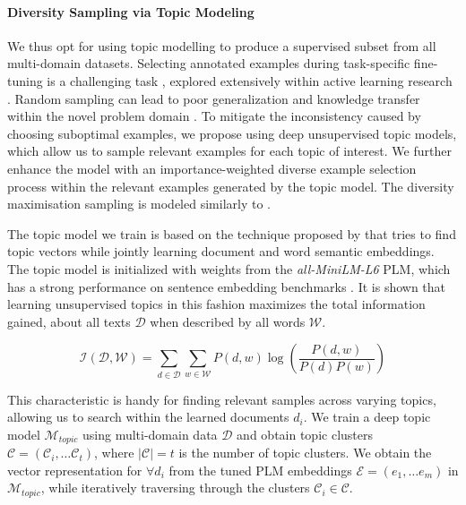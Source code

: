 \documentclass[11pt]{article}
\begin{document}
\paragraph{Diversity Sampling via Topic Modeling}

We thus opt for using topic modelling to produce a supervised subset from all multi-domain datasets. Selecting annotated examples during task-specific fine-tuning is a challenging task \cite{shao2019learning}, explored extensively within active learning research \cite{hino2020active, konyushkova2017learning}. Random sampling can lead to poor generalization and knowledge transfer within the novel problem domain \cite{das2021importance, perez2021true}. To mitigate the inconsistency caused by choosing suboptimal examples, we propose using deep unsupervised topic models, which allow us to sample relevant examples for each topic of interest. We further enhance the model with an importance-weighted diverse example selection process \cite{shao2019learning,yang2015multi} within the relevant examples generated by the topic model. The diversity maximisation sampling is modeled similarly to \citet{yang2015multi}.

The topic model we train is based on the technique proposed by \citet{angelov2020top2vec} that tries to find topic vectors while jointly learning document and word semantic embeddings. The topic model is initialized with weights from the \textit{all-MiniLM-L6} PLM, which has a strong performance on sentence embedding benchmarks \citep{wang2020minilm}. It is shown that learning unsupervised topics in this fashion maximizes the total information gained, about all texts $\mathcal{D}$ when described by all words $\mathcal{W}$.

\[\mathcal{I}(\mathcal{D}, \mathcal{W})=\sum_{d \in \mathcal{D}} \sum_{w \in \mathcal{W}} P(d, w) \log \left(\frac{P(d, w)}{P(d) P(w)}\right)\]


This characteristic is handy for finding relevant samples across varying topics, allowing us to search within the learned documents $d_i$. We train a deep topic model $\mathcal{M}_\textit{topic}$ using multi-domain data $\mathcal{D}$ and obtain topic clusters $\mathcal{C} = (\mathcal{C}_i, \dots \mathcal{C}_t)$, where $\lvert \mathcal{C} \rvert = t$ is the number of topic clusters. We obtain the vector representation for $\forall d_i$ from the tuned PLM embeddings $\mathcal{E} = (e_1, \dots e_m)$ in $\mathcal{M}_\textit{topic}$, while iteratively traversing through the clusters $\mathcal{C}_i \in \mathcal{C}$.
\end{document}
